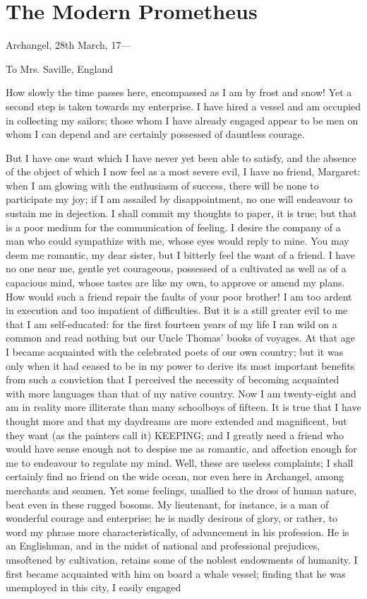\chapter{The Modern Prometheus}

Archangel, 28th March, 17---

To Mrs. Saville, England

How slowly the time passes here, encompassed as I am by frost and snow! Yet a second step is taken towards my enterprise. I have hired a vessel and am occupied in collecting my sailors; those whom I have already engaged appear to be men on whom I can depend and are certainly possessed of dauntless courage.

But I have one want which I have never yet been able to satisfy, and the absence of the object of which I now feel as a most severe evil, I have no friend, Margaret: when I am glowing with the enthusiasm of success, there will be none to participate my joy; if I am assailed by disappointment, no one will endeavour to sustain me in dejection. I shall commit my thoughts to paper, it is true; but that is a poor medium for the communication of feeling. I desire the company of a man who could sympathize with me, whose eyes would reply to mine. You may deem me romantic, my dear sister, but I bitterly feel the want of a friend. I have no one near me, gentle yet courageous, possessed of a cultivated as well as of a capacious mind, whose tastes are like my own, to approve or amend my plans. How would such a friend repair the faults of your poor brother! I am too ardent in execution and too impatient of difficulties. But it is a still greater evil to me that I am self-educated: for the first fourteen years of my life I ran wild on a common and read nothing but our Uncle Thomas' books of voyages. At that age I became acquainted with the celebrated poets of our own country; but it was only when it had ceased to be in my power to derive its most important benefits from such a conviction that I perceived the necessity of becoming acquainted with more languages than that of my native country. Now I am twenty-eight and am in reality more illiterate than many schoolboys of fifteen. It is true that I have thought more and that my daydreams are more extended and magnificent, but they want (as the painters call it) KEEPING; and I greatly need a friend who would have sense enough not to despise me as romantic, and affection enough for me to endeavour to regulate my mind. Well, these are useless complaints; I shall certainly find no friend on the wide ocean, nor even here in Archangel, among merchants and seamen. Yet some feelings, unallied to the dross of human nature, beat even in these rugged bosoms. My lieutenant, for instance, is a man of wonderful courage and enterprise; he is madly desirous of glory, or rather, to word my phrase more characteristically, of advancement in his profession. He is an Englishman, and in the midst of national and professional prejudices, unsoftened by cultivation, retains some of the noblest endowments of humanity. I first became acquainted with him on board a whale vessel; finding that he was unemployed in this city, I easily engaged 